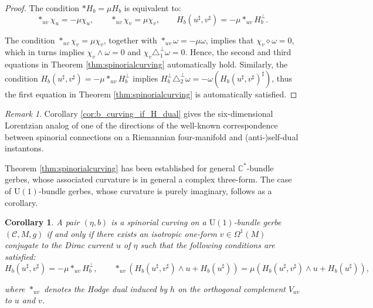 \documentclass[10pt,a4paper,twoside,reqno]{amsart}
\theoremstyle{plain}
\newtheorem{cor}[thm]{Corollary}
\theoremstyle{definition}
\theoremstyle{remark}
\newtheorem{remark}[thm]{Remark}
\def\cC{{\mathcal C}}
\def\U{\mathrm{U}}
\def\cC{\mathcal{C}}
\begin{document}
\begin{proof}
The condition $\ast H_b = \mu H_b$ is equivalent to: $$*_{uv}\chi_u=-\mu\chi_u,\qquad *_{uv}\chi_v=\mu\chi_v,\qquad H_b(u^\sharp,v^\sharp)=-\mu*_{uv}H_b^\perp.$$

The condition $*_{uv}\chi_v=\mu\chi_v$, together with $\ast_{uv} \omega = -\mu \omega$, implies that $\chi_v\diamond\omega=0$, which in turns implies $\chi_v\wedge\omega=0$ and $\chi_v\triangle_1^\perp\omega=0$. Hence, the second and third equations in Theorem \ref{thm:spinorialcurving} automatically hold. Similarly, the condition $H_b(u^\sharp,v^\sharp)=-\mu*_{uv}H_b^\perp$ implies $H_b^\perp\triangle_2^\perp\omega=-\omega(H_b(u^\sharp,v^\sharp)^\sharp)$, thus the first equation in Theorem \ref{thm:spinorialcurving} is automatically satisfied.
\end{proof}

\begin{remark}
Corollary \ref{cor:b_curving_if_H_dual} gives the six-dimensional Lorentzian analog of one of the directions of the well-known correspondence between spinorial connections on a Riemannian four-manifold and (anti-)self-dual instantons. 
\end{remark}

\noindent
Theorem \ref{thm:spinorialcurving} has been established for general $\mathbb{C}^{\ast}$-bundle gerbes, whose associated curvature is in general a complex three-form. The case of $\U(1)$-bundle gerbes, whose curvature is purely imaginary, follows as a corollary.

\begin{cor}
\label{cor:U(1)spinorialb}
A pair $(\eta,b)$ is a spinorial curving on a $\U(1)$-bundle gerbe $(\cC,M,g)$ if and only if there exists an isotropic one-form $v\in \Omega^1(M)$ conjugate to the Dirac current $u$ of $\eta$ such that the following conditions are satisfied:
\begin{equation*}
H_b(u^\sharp,v^\sharp)=-\mu*_{uv}H_b^\perp,\qquad *_{uv}(H_b(u^\sharp,v^\sharp)\wedge u+H_b(u^\sharp))=\mu(H_b(u^\sharp,v^\sharp)\wedge u+H_b(u^\sharp)),
\end{equation*}

\noindent
where $\ast_{uv}$ denotes the Hodge dual induced by $h$ on the orthogonal complement $V_{uv}$ to $u$ and $v$. 
\end{cor}
\end{document}

